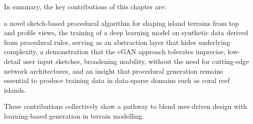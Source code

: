 In summary, the key contributions of this chapter are:
\begin{Itemize}
\Item{} a novel sketch-based procedural algorithm for shaping island terrains from top and profile views,
\Item{} the training of a deep learning model on synthetic data derived from procedural rules, serving as an abstraction layer that hides underlying complexity,
\Item{} a demonstration that the cGAN approach tolerates imprecise, low-detail user input sketches, broadening usability, without the need for cutting-edge network architectures,
\Item{} and an insight that procedural generation remains essential to produce training data in data-sparse domains such as coral reef islands.
\end{Itemize}
These contributions collectively show a pathway to blend user-driven design with learning-based generation in terrain modelling.















